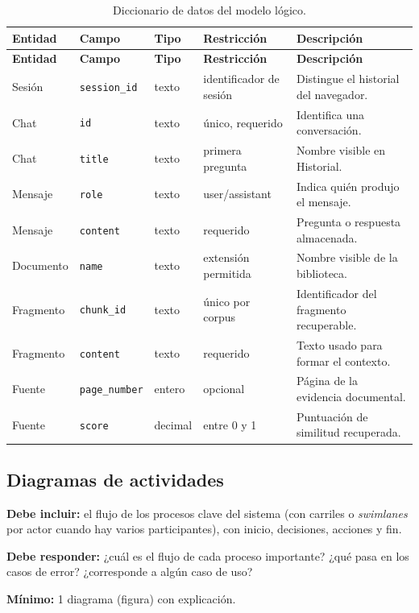 \begin{longtable}{p{}p{}p{}p{}p{}}
\caption{Diccionario de datos del modelo lógico.}\label{tab:diccionario_datos}\\
\toprule
\textbf{Entidad} & \textbf{Campo} & \textbf{Tipo} & \textbf{Restricción} & \textbf{Descripción}\\
\midrule
\endfirsthead
\toprule
\textbf{Entidad} & \textbf{Campo} & \textbf{Tipo} & \textbf{Restricción} & \textbf{Descripción}\\
\midrule
\endhead
Sesión & \texttt{session\_id} & texto & identificador de sesión & Distingue el historial del navegador.\\
Chat & \texttt{id} & texto & único, requerido & Identifica una conversación.\\
Chat & \texttt{title} & texto & primera pregunta & Nombre visible en Historial.\\
Mensaje & \texttt{role} & texto & user/assistant & Indica quién produjo el mensaje.\\
Mensaje & \texttt{content} & texto & requerido & Pregunta o respuesta almacenada.\\
Documento & \texttt{name} & texto & extensión permitida & Nombre visible de la biblioteca.\\
Fragmento & \texttt{chunk\_id} & texto & único por corpus & Identificador del fragmento recuperable.\\
Fragmento & \texttt{content} & texto & requerido & Texto usado para formar el contexto.\\
Fuente & \texttt{page\_number} & entero & opcional & Página de la evidencia documental.\\
Fuente & \texttt{score} & decimal & entre 0 y 1 & Puntuación de similitud recuperada.\\
\bottomrule
\end{longtable}

\subsection{Diagramas de actividades} \label{sec:diagramas_actividades} %

\begin{guia}
\textbf{Debe incluir:} el flujo de los procesos clave del sistema (con carriles o \emph{swimlanes} por actor cuando hay
varios participantes), con inicio, decisiones, acciones y fin.

\textbf{Debe responder:} ¿cuál es el flujo de cada proceso importante? ¿qué pasa en los casos de error? ¿corresponde a
algún caso de uso?

\textbf{Mínimo:} 1 diagrama (figura) con explicación.
\end{guia}

